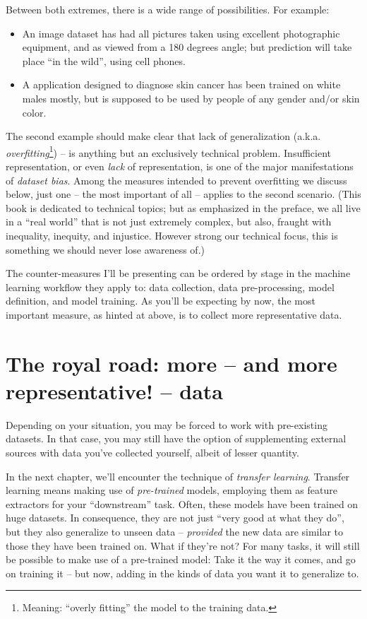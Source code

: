 \documentclass[
  letterpaper,
]{krantz}
\begin{document}
Between both extremes, there is a wide range of possibilities. For
example:

\begin{itemize}
\item
  An image dataset has had all pictures taken using excellent
  photographic equipment, and as viewed from a 180 degrees angle; but
  prediction will take place ``in the wild'', using cell phones.
\item
  A application designed to diagnose skin cancer has been trained on
  white males mostly, but is supposed to be used by people of any gender
  and/or skin color.
\end{itemize}

The second example should make clear that lack of generalization (a.k.a.
\emph{overfitting}\footnote{Meaning: ``overly fitting'' the model to the
  training data.}) -- is anything but an exclusively technical problem.
Insufficient representation, or even \emph{lack} of representation, is
one of the major manifestations of \emph{dataset bias}. Among the
measures intended to prevent overfitting we discuss below, just one --
the most important of all -- applies to the second scenario. (This book
is dedicated to technical topics; but as emphasized in the preface, we
all live in a ``real world'' that is not just extremely complex, but
also, fraught with inequality, inequity, and injustice. However strong
our technical focus, this is something we should never lose awareness
of.)

The counter-measures I'll be presenting can be ordered by stage in the
machine learning workflow they apply to: data collection, data
pre-processing, model definition, and model training. As you'll be
expecting by now, the most important measure, as hinted at above, is to
collect more representative data.

\hypertarget{the-royal-road-more-and-more-representative-data}{%
\section{The royal road: more -- and more representative! --
data}\label{the-royal-road-more-and-more-representative-data}}

Depending on your situation, you may be forced to work with pre-existing
datasets. In that case, you may still have the option of supplementing
external sources with data you've collected yourself, albeit of lesser
quantity.

In the next chapter, we'll encounter the technique of \emph{transfer
learning}. Transfer learning means making use of \emph{pre-trained}
models, employing them as feature extractors for your ``downstream''
task. Often, these models have been trained on huge datasets. In
consequence, they are not just ``very good at what they do'', but they
also generalize to unseen data -- \emph{provided} the new data are
similar to those they have been trained on. What if they're not? For
many tasks, it will still be possible to make use of a pre-trained
model: Take it the way it comes, and go on training it -- but now,
adding in the kinds of data you want it to generalize to.
\end{document}
